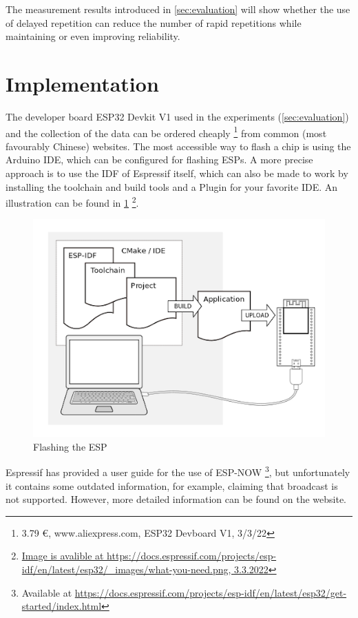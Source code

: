 The measurement results introduced in \cref{sec:evaluation} will show whether the use of delayed repetition 
can reduce the number of rapid repetitions while maintaining or even improving reliability.

\section{Implementation}

The developer board ESP32 Devkit V1 used in the experiments (\cref{sec:evaluation}) 
and the collection of the data can be ordered cheaply 
\footnote{3.79 €, www.aliexpress.com, ESP32 Devboard V1, 3/3/22}
from common (most favourably Chinese) websites. 
The most accessible way to flash a chip is using the Arduino IDE, which can be configured for flashing ESPs.
A more precise approach is to use the IDF of Espressif itself, 
which can also be made to work by installing the toolchain and build tools and a Plugin for your favorite IDE.
An illustration can be found in \cref{fig:ESP-IDF}
\footnote{\url{Image is avalible at https://docs.espressif.com/projects/esp-idf/en/latest/esp32/_images/what-you-need.png, 3.3.2022}}.

\begin{figure}[h]
	\centering
	\includegraphics[scale=0.4]{figures/ESP-ISF.png}
	\caption{Flashing the ESP}
	\label{fig:ESP-IDF}
\end{figure}

Espressif has provided a user guide for the use of ESP-NOW 
\footnote{Available at \url{https://docs.espressif.com/projects/esp-idf/en/latest/esp32/get-started/index.html}},
but unfortunately it contains some outdated information, 
for example, claiming that broadcast is not supported.
However, more detailed information can be found on the website.

